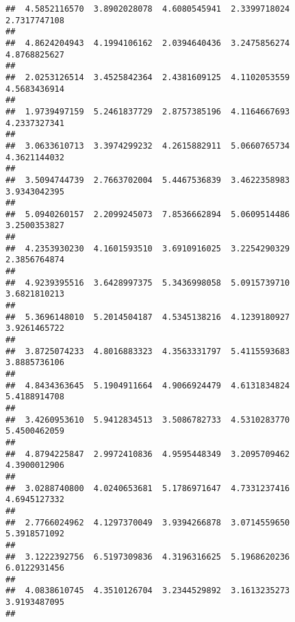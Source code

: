 \documentclass[]{article}
\begin{document}
\begin{verbatim}
##  4.5852116570  3.8902028078  4.6080545941  2.3399718024  2.7317747108 
##                                                                       
##  4.8624204943  4.1994106162  2.0394640436  3.2475856274  4.8768825627 
##                                                                       
##  2.0253126514  3.4525842364  2.4381609125  4.1102053559  4.5683436914 
##                                                                       
##  1.9739497159  5.2461837729  2.8757385196  4.1164667693  4.2337327341 
##                                                                       
##  3.0633610713  3.3974299232  4.2615882911  5.0660765734  4.3621144032 
##                                                                       
##  3.5094744739  2.7663702004  5.4467536839  3.4622358983  3.9343042395 
##                                                                       
##  5.0940260157  2.2099245073  7.8536662894  5.0609514486  3.2500353827 
##                                                                       
##  4.2353930230  4.1601593510  3.6910916025  3.2254290329  2.3856764874 
##                                                                       
##  4.9239395516  3.6428997375  5.3436998058  5.0915739710  3.6821810213 
##                                                                       
##  5.3696148010  5.2014504187  4.5345138216  4.1239180927  3.9261465722 
##                                                                       
##  3.8725074233  4.8016883323  4.3563331797  5.4115593683  3.8885736106 
##                                                                       
##  4.8434363645  5.1904911664  4.9066924479  4.6131834824  5.4188914708 
##                                                                       
##  3.4260953610  5.9412834513  3.5086782733  4.5310283770  5.4500462059 
##                                                                       
##  4.8794225847  2.9972410836  4.9595448349  3.2095709462  4.3900012906 
##                                                                       
##  3.0288740800  4.0240653681  5.1786971647  4.7331237416  4.6945127332 
##                                                                       
##  2.7766024962  4.1297370049  3.9394266878  3.0714559650  5.3918571092 
##                                                                       
##  3.1222392756  6.5197309836  4.3196316625  5.1968620236  6.0122931456 
##                                                                       
##  4.0838610745  4.3510126704  3.2344529892  3.1613235273  3.9193487095 
##                                                                       

\end{verbatim}
\end{document}
